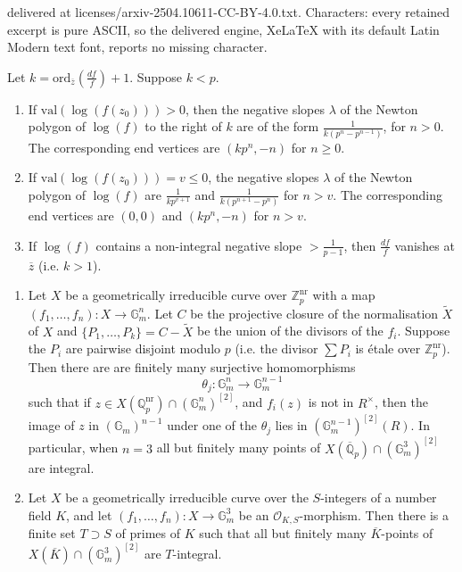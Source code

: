 \documentclass[10pt,a4paper]{amsart}
\def\Q{\mathbb Q}
\def\Z{\mathbb Z}
\newcommand{\nr}{\mathrm{nr}}
\newcommand{\ord}{\mathrm{ord}}
\newcommand{\val}{\mathrm{val}}
\begin{document}
delivered at licenses/arxiv-2504.10611-CC-BY-4.0.txt. Characters: every retained excerpt is pure ASCII, so the delivered engine, XeLaTeX with its default Latin Modern text font, reports no missing character.
\begin{lemma}\label{lemma:slop}
Let $k =\ord _{\overline{z}}(\frac{df}{f})+1.$ Suppose $k<p$.
\begin{enumerate}
\item If $\val (\log (f(z_0 )))>0$, then the negative slopes $\lambda$ of the Newton polygon of $\log (f)$ to the right of $k$ are of the form $\frac{1}{k(p^n-p^{n-1})}$, for $n>0$. The corresponding end vertices are $(kp^n,-n)$ for $n\geq 0$.
\item If $\val (\log (f(z_0 )))=v\leq 0$, the negative slopes $\lambda $ of the Newton polygon of $\log (f)$ are $\frac{1}{k p^{v+1}}$ and $\frac{1}{k(p^{n+1}-p^{n})}$ for $n>v$. The corresponding end vertices are $(0,0)$ and $(kp^n ,-n)$ for $n>v$.
\item If $\log (f)$ contains a non-integral negative slope $>\frac{1}{p-1}$, then $\frac{df}{f}$ vanishes at $\overline{z}$ (i.e. $k>1$).
\end{enumerate}
\end{lemma}

\begin{lemma}\label{lemma:integral}
\begin{enumerate}
\item Let $X$ be a geometrically irreducible curve over $\Z _p ^{\nr}$ with a map $(f_1 ,\ldots ,f_n ):X\to \mathbb{G}_m ^n $. Let $C$ be the projective closure of the normalisation $\widetilde{X}$ of $X$ and $\{ P_1 ,\ldots ,P_k \}=C-\widetilde{X}$ be the union of the divisors of the $f_i$. Suppose the $P_i$ are pairwise disjoint modulo $p$ (i.e. the divisor $\sum P_i $ is \'etale over $\Z _p ^{\nr}$). Then there are are finitely many surjective homomorphisms
\[
\theta _j :\mathbb{G}_m ^n \to \mathbb{G}_m ^{n-1}
\]
such that if $z\in X(\Q _p ^{\mathrm{nr}})\cap (\mathbb{G}_m ^n )^{[2]}$, and $f_i (z)$ is not in $R^\times $, then the image of $z$ in $(\mathbb{G}_m )^{n-1}$ under one of the $\theta _j$ lies in $(\mathbb{G}_m ^{n-1})^{[2]}(R)$. In particular, when $n=3$ all but finitely many points of $X(\overline{\Q }_p )\cap (\mathbb{G}_m ^3 )^{[2]}$ are integral.
\item Let $X$ be a geometrically irreducible curve over the $S$-integers of a number field $K$, and let $(f_1 ,\ldots ,f_n ):X\to \mathbb{G}_m ^3$ be an $\mathcal{O}_{K,S}$-morphism. Then there is a finite set $T\supset S$ of primes of $K$ such that all but finitely many $\overline{K}$-points of $X(\overline{K})\cap (\mathbb{G}_m ^3 )^{[2]}$ are $T$-integral.
\end{enumerate}
\end{lemma}
\end{document}
